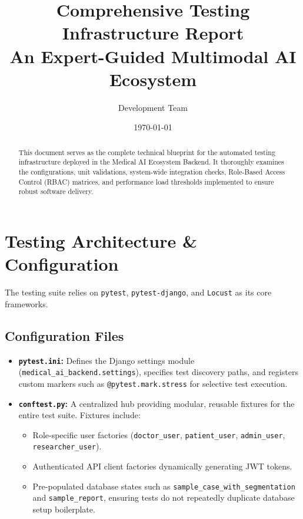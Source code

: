 \documentclass[11pt, a4paper]{article}
\title{
    \vspace{-2cm}
    \textbf{\Huge Comprehensive Testing Infrastructure Report}\\
    \vspace{0.5cm}
    \large An Expert-Guided Multimodal AI Ecosystem
}
\author{Development Team}
\date{\today}
\begin{document}
\maketitle

\begin{abstract}
This document serves as the complete technical blueprint for the automated testing infrastructure deployed in the Medical AI Ecosystem Backend. It thoroughly examines the configurations, unit validations, system-wide integration checks, Role-Based Access Control (RBAC) matrices, and performance load thresholds implemented to ensure robust software delivery.
\end{abstract}

\tableofcontents
\newpage

\section{Testing Architecture \& Configuration}
The testing suite relies on \texttt{pytest}, \texttt{pytest-django}, and \texttt{Locust} as its core frameworks.

\subsection{Configuration Files}
\begin{itemize}
    \item \textbf{\texttt{pytest.ini}:} Defines the Django settings module (\texttt{medical\_ai\_backend.settings}), specifies test discovery paths, and registers custom markers such as \texttt{@pytest.mark.stress} for selective test execution.
    \item \textbf{\texttt{conftest.py}:} A centralized hub providing modular, reusable fixtures for the entire test suite. Fixtures include:
    \begin{itemize}
        \item Role-specific user factories (\texttt{doctor\_user}, \texttt{patient\_user}, \texttt{admin\_user}, \texttt{researcher\_user}).
        \item Authenticated API client factories dynamically generating JWT tokens.
        \item Pre-populated database states such as \texttt{sample\_case\_with\_segmentation} and \texttt{sample\_report}, ensuring tests do not repeatedly duplicate database setup boilerplate.
    \end{itemize}
\end{itemize}
\end{document}
